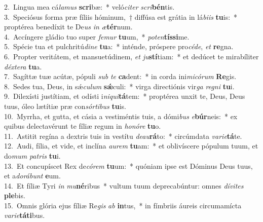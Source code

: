 {2.~}Lingua mea cá\textit{la}\textit{mus} \textbf{scri}bæ:~* veló\textit{ci}\textit{ter} \textit{scri}\textbf{bén}tis.\\
{3.~}Speciósus forma præ fíliis hóminum,~† diffúsa est grátia in lá\textit{bi}\textit{is} \textbf{tu}is:~* proptérea benedíxit te De\textit{us} \textit{in} \textit{æ}\textbf{tér}num.\\
{4.~}Accíngere gládio tuo super \textit{fe}\textit{mur} \textbf{tu}um,~* \textit{po}\textit{ten}\textbf{tís}\textbf{si}me.\\
{5.~}Spécie tua et pulchritú\textit{di}\textit{ne} \textbf{tu}a:~* inténde, próspere pro\textit{cé}\textit{de}, \textit{et} \textbf{re}gna.\\
{6.~}Propter veritátem, et mansuetúdinem, \textit{et} \textit{ju}\textbf{stí}tiam:~* et dedúcet te mirabíliter \textit{déx}\textit{te}\textit{ra} \textbf{tu}a.\\
{7.~}Sagíttæ tuæ acútæ, pópuli \textit{sub} \textit{te} \textbf{ca}dent:~* in corda ini\textit{mi}\textit{có}\textit{rum} \textbf{Re}gis.\\
{8.~}Sedes tua, Deus, in sǽ\textit{cu}\textit{lum} \textbf{sǽ}culi:~* virga directiónis vir\textit{ga} \textit{re}\textit{gni} \textbf{tu}i.\\
{9.~}Dilexísti justítiam, et odísti i\textit{ni}\textit{qui}\textbf{tá}tem:~* proptérea unxit te, Deus, Deus tuus, óleo lætítiæ præ con\textit{sór}\textit{ti}\textit{bus} \textbf{tu}is.\\
{10.~}Myrrha, et gutta, et cásia a vestiméntis tuis, a dómi\textit{bus} \textit{e}\textbf{búr}neis:~* ex quibus delectavérunt te fíliæ regum in \textit{ho}\textit{nó}\textit{re} \textbf{tu}o.\\
{11.~}Astitit regína a dextris tuis in vestítu \textit{de}\textit{au}\textbf{rá}to:~* circúmdata \textit{va}\textit{ri}\textit{e}\textbf{tá}te.\\
{12.~}Audi, fília, et vide, et inclína \textit{au}\textit{rem} \textbf{tu}am:~* et oblivíscere pópulum tuum, et do\textit{mum} \textit{pa}\textit{tris} \textbf{tu}i.\\
{13.~}Et concupíscet Rex de\textit{có}\textit{rem} \textbf{tu}um:~* quóniam ipse est Dóminus Deus tuus, et a\textit{do}\textit{rá}\textit{bunt} \textbf{e}um.\\
{14.~}Et fíliæ Tyri \textit{in} \textit{mu}\textbf{né}ribus~* vultum tuum deprecabúntur: omnes \textit{dí}\textit{vi}\textit{tes} \textbf{ple}bis.\\
{15.~}Omnis glória ejus fíliæ Re\textit{gis} \textit{ab} \textbf{in}tus,~* in fímbriis áureis circumamícta \textit{va}\textit{ri}\textit{e}\textbf{tá}\textbf{ti}bus.\\
